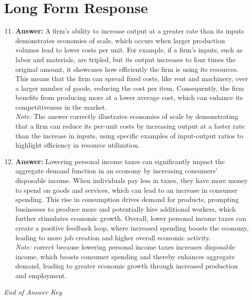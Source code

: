 \documentclass[12pt]{article}
\begin{document}
\section*{Long Form Response}
\begin{enumerate}[label=\arabic*.]
\setcounter{enumi}{10}
\item \textbf{Answer:} A firm's ability to increase output at a greater rate than its inputs demonstrates economies of scale, which occurs when larger production volumes lead to lower costs per unit. For example, if a firm's inputs, such as labor and materials, are tripled, but its output increases to four times the original amount, it showcases how efficiently the firm is using its resources. This means that the firm can spread fixed costs, like rent and machinery, over a larger number of goods, reducing the cost per item. Consequently, the firm benefits from producing more at a lower average cost, which can enhance its competitiveness in the market.
\\ \textit{Note:} The answer correctly illustrates economies of scale by demonstrating that a firm can reduce its per-unit costs by increasing output at a faster rate than the increase in inputs, using specific examples of input-output ratios to highlight efficiency in resource utilization.
\item \textbf{Answer:} Lowering personal income taxes can significantly impact the aggregate demand function in an economy by increasing consumers' disposable income. When individuals pay less in taxes, they have more money to spend on goods and services, which can lead to an increase in consumer spending. This rise in consumption drives demand for products, prompting businesses to produce more and potentially hire additional workers, which further stimulates economic growth. Overall, lower personal income taxes can create a positive feedback loop, where increased spending boosts the economy, leading to more job creation and higher overall economic activity.
\\ \textit{Note:} correct because lowering personal income taxes increases disposable income, which boosts consumer spending and thereby enhances aggregate demand, leading to greater economic growth through increased production and employment.
\end{enumerate}

\vfill
\noindent\textit{End of Answer Key}
\end{document}
